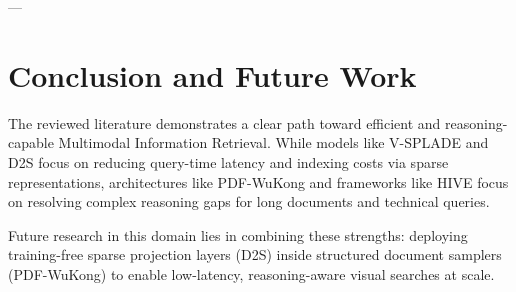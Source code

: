 \documentclass[11pt,a4paper]{article}
\begin{document}
---

\section{Conclusion and Future Work}
The reviewed literature demonstrates a clear path toward efficient and reasoning-capable Multimodal Information Retrieval. While models like V-SPLADE and D2S focus on reducing query-time latency and indexing costs via sparse representations, architectures like PDF-WuKong and frameworks like HIVE focus on resolving complex reasoning gaps for long documents and technical queries. 

Future research in this domain lies in combining these strengths: deploying training-free sparse projection layers (D2S) inside structured document samplers (PDF-WuKong) to enable low-latency, reasoning-aware visual searches at scale.
\end{document}
